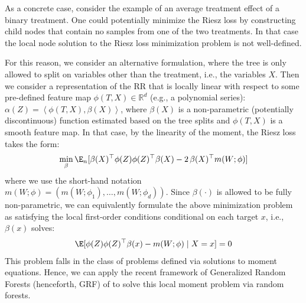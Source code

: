 \documentclass[nohyperref]{article}
\newcommand{\ldot}[2]{\ensuremath{\left\langle #1, #2 \right\rangle}}
\newcommand{\RR}{\ensuremath{\mathbb{R}}}
\theoremstyle{plain}
\theoremstyle{definition}
\theoremstyle{remark}
\begin{document}
As a concrete case, consider the example of an average treatment effect of a binary treatment. One could potentially minimize the Riesz loss by constructing child nodes that contain no samples from one of the two treatments. In that case the local node solution to the Riesz loss minimization problem is not well-defined. 

For this reason, we consider an alternative formulation, where the tree is only allowed to split on variables other than the treatment, i.e., the variables $X$. Then we consider a representation of the RR that is locally linear with respect to some pre-defined feature map $\phi(T, X)\in \RR^d$ (e.g., a polynomial series): $\alpha(Z) = \ldot{\phi(T, X)}{\beta(X)}$, where $\beta(X)$ is a non-parametric (potentially discontinuous) function estimated based on the tree splits and $\phi(T, X)$ is a smooth feature map. In that case, by the linearity of the moment, the Riesz loss takes the form:
\begin{align}
    \min_{\beta} \E_n[\beta(X)^\top \phi(Z) \phi(Z)^\top \beta(X) - 2\, \beta(X)^\top m(W; \phi)]
\end{align}
where we use the short-hand notation $m(W; \phi)=(m(W; \phi_1), \ldots, m(W; \phi_d))$.
Since $\beta(\cdot)$ is allowed to be fully non-parametric, we can equivalently formulate the above minimization problem as satisfying the local first-order conditions conditional on each target $x$, i.e., $\beta(x)$ solves:
\begin{align}
\E[\phi(Z)\phi(Z)^\top\beta(x)  - m(W; \phi) \mid X=x] = 0
\end{align}
This problem falls in the class of problems defined via solutions to moment equations. Hence, we can apply the recent framework of Generalized Random Forests (henceforth, GRF) of \citet{athey2019generalized} to solve this local moment problem via random forests.
\end{document}
